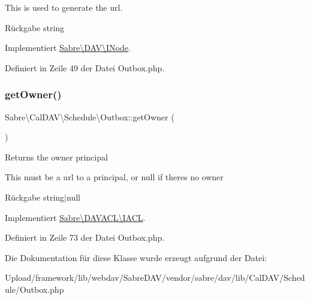 This is used to generate the url.

\begin{DoxyReturn}{Rückgabe}
string 
\end{DoxyReturn}


Implementiert \mbox{\hyperlink{interface_sabre_1_1_d_a_v_1_1_i_node_ab616fe836b1ae36af12126a2bc934dce}{Sabre\textbackslash{}\+D\+A\+V\textbackslash{}\+I\+Node}}.



Definiert in Zeile 49 der Datei Outbox.\+php.

\mbox{\label{class_sabre_1_1_cal_d_a_v_1_1_schedule_1_1_outbox_ac8cf772a8ade2c6c02c8218f0f4689f0}} 
\subsubsection{\texorpdfstring{get\+Owner()}{getOwner()}}
{\footnotesize\ttfamily Sabre\textbackslash{}\+Cal\+D\+A\+V\textbackslash{}\+Schedule\textbackslash{}\+Outbox\+::get\+Owner (\begin{DoxyParamCaption}{ }\end{DoxyParamCaption})}

Returns the owner principal

This must be a url to a principal, or null if there\textquotesingle{}s no owner

\begin{DoxyReturn}{Rückgabe}
string$\vert$null 
\end{DoxyReturn}


Implementiert \mbox{\hyperlink{interface_sabre_1_1_d_a_v_a_c_l_1_1_i_a_c_l_a05f531b4ae1a86eab4e6e95b0413390e}{Sabre\textbackslash{}\+D\+A\+V\+A\+C\+L\textbackslash{}\+I\+A\+CL}}.



Definiert in Zeile 73 der Datei Outbox.\+php.



Die Dokumentation für diese Klasse wurde erzeugt aufgrund der Datei\+:\begin{DoxyCompactItemize}
\item 
Upload/framework/lib/webdav/\+Sabre\+D\+A\+V/vendor/sabre/dav/lib/\+Cal\+D\+A\+V/\+Schedule/Outbox.\+php\end{DoxyCompactItemize}
